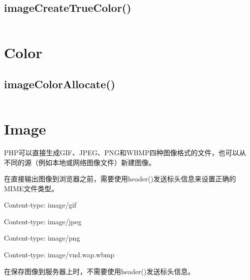 \begin{lstlisting}[language=PHP]

\end{lstlisting}


\subsection{imageCreateTrueColor()}








\begin{lstlisting}[language=PHP]

\end{lstlisting}


\section{Color}


\subsection{imageColorAllocate()}



\begin{lstlisting}[language=PHP]

\end{lstlisting}

\section{Image}




PHP可以直接生成GIF、JPEG、PNG和WBMP四种图像格式的文件，也可以从不同的源（例如本地或网络图像文件）新建图像。


在直接输出图像到浏览器之前，需要使用header()发送标头信息来设置正确的MIME文件类型。

\begin{compactitem}
\item Content-type: image/gif
\item Content-type: image/jpeg
\item Content-type: image/png
\item Content-type: image/vnd.wap.wbmp
\end{compactitem}

在保存图像到服务器上时，不需要使用header()发送标头信息。





